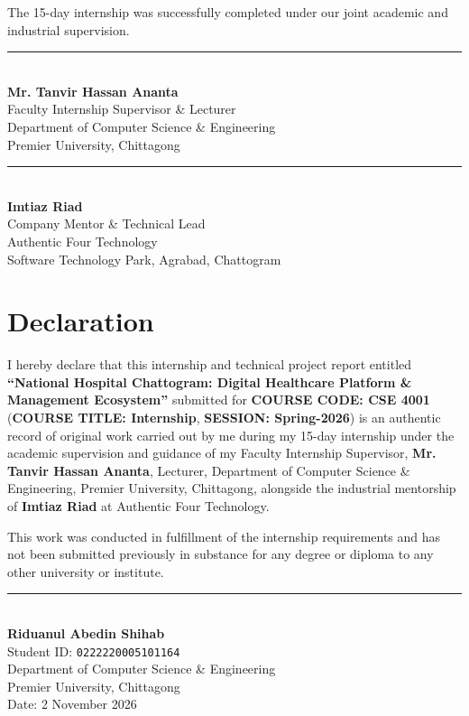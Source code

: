 \documentclass[11pt,a4paper,oneside]{report}
\begin{document}
The 15-day internship was successfully completed under our joint academic and industrial supervision.

\vspace{2.5cm}
\noindent
\begin{minipage}{0.52\textwidth}
    \rule{6.8cm}{0.6pt}\\
    \textbf{Mr. Tanvir Hassan Ananta}\\
    Faculty Internship Supervisor \& Lecturer\\
    Department of Computer Science \& Engineering\\
    Premier University, Chittagong
\end{minipage}
\hfill
\begin{minipage}{0.45\textwidth}
    \begin{flushright}
        \rule{6.2cm}{0.6pt}\\
        \textbf{Imtiaz Riad}\\
        Company Mentor \& Technical Lead\\
        Authentic Four Technology\\
        Software Technology Park, Agrabad, Chattogram
    \end{flushright}
\end{minipage}

\clearpage

\chapter*{Declaration}
I hereby declare that this internship and technical project report entitled \textbf{``National Hospital Chattogram: Digital Healthcare Platform \& Management Ecosystem''} submitted for \textbf{COURSE CODE: CSE 4001} (\textbf{COURSE TITLE: Internship}, \textbf{SESSION: Spring-2026}) is an authentic record of original work carried out by me during my 15-day internship under the academic supervision and guidance of my Faculty Internship Supervisor, \textbf{Mr. Tanvir Hassan Ananta}, Lecturer, Department of Computer Science \& Engineering, Premier University, Chittagong, alongside the industrial mentorship of \textbf{Imtiaz Riad} at Authentic Four Technology.

This work was conducted in fulfillment of the internship requirements and has not been submitted previously in substance for any degree or diploma to any other university or institute.

\vspace{1.5cm}
\noindent
\begin{minipage}{0.55\textwidth}
    \rule{6.5cm}{0.6pt}\\
    \textbf{Riduanul Abedin Shihab}\\
    Student ID: \texttt{0222220005101164}\\
    Department of Computer Science \& Engineering\\
    Premier University, Chittagong\\
    Date: 2 November 2026
\end{minipage}
\end{document}
